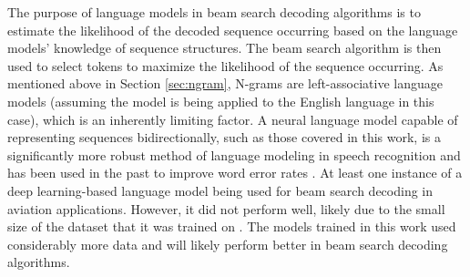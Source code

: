 \documentclass[12pt]{article}
\begin{document}
The purpose of language models in beam search decoding algorithms is to estimate the likelihood of the decoded sequence occurring based on the language models' knowledge of sequence structures. The beam search algorithm is then used to select tokens to maximize the likelihood of the sequence occurring. As mentioned above in Section \ref{sec:ngram}, N-grams are left-associative language models (assuming the model is being applied to the English language in this case), which is an inherently limiting factor. A neural language model capable of representing sequences bidirectionally, such as those covered in this work, is a significantly more robust method of language modeling in speech recognition and has been used in the past to improve word error rates \cite{kriman_quartznet_2020,majumdar_citrinet_2021}. At least one instance of a deep learning-based language model being used for beam search decoding in aviation applications. However, it did not perform well, likely due to the small size of the dataset that it was trained on \cite{pellegrini_airbus_2019}. The models trained in this work used considerably more data and will likely perform better in beam search decoding algorithms.

\newpage


\end{document}
